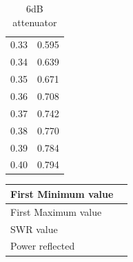 \documentclass{report}
\begin{document}
\begin{multicols}{2}
\begin{table}[H]
\begin{tabular}{cc}
        0.33 & 0.595 \\
        0.34 & 0.639 \\
        0.35 & 0.671 \\
        0.36 & 0.708 \\
        0.37 & 0.742 \\
        0.38 & 0.770 \\
        0.39 & 0.784 \\
        0.40 & 0.794 \\
        \hline
        \end{tabular}
        \caption{6dB attenuator}
    \end{table}
    \begin{table}[H]
        \begin{tabular}{|l|l|}
            \hline
            First Minimum value & \\ \hline
            First Maximum value & \\ \hline
            SWR value & \\ \hline
            Power reflected & \\ \hline
            
        \end{tabular}
    \end{table}
    \end{multicols}
\end{document}
